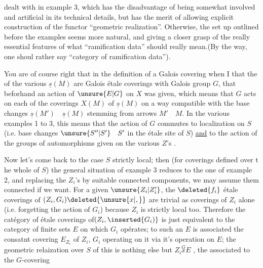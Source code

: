 dealt with in example 3, which has the disadvantage of being somewhat involved and artificial in its technical details, but has the merit of allowing explicit construction of the functor ``geometric realization''. Otherwise, the set up outlined before the examples seems more natural, and giving a closer grasp of the  really essential features of what ``ramification data'' should really mean.(By the way, one shoul rather say ``category of ramification data'').

You are of course right that in the definition of a Galois covering when I  that the  of the various $\underline{s}(M)$ are Galois étale coverings with Galois group $G$, that beforhand an action of $\unsure{E|G}$ on $X$ was given, which means that $G$ acts on each of the coverings $X(M)$ of $\underline{s}(M)$ on a way compatible with the base changes $\underline{s}(M')\quad\underline{s}(M)$ stemming from arrows  $M'\quad M$. In the various examples 1 to 3, this means that the action of $G$ commutes to  localization on $S$ (i.e. base changes $\unsure{S''|S'}\quad S'$ in the étale site of $S$) \uline{and} to the action of the groups of automorphisms given on the various $Z$'s .

Now let's come back to the case $S$ strictly local; then (for coverings defined over t he whole of $S$) the general situation of example 3 reduces to the one of example 2, and replacing the $Z_i$'s by suitable connected components, we may assume them connected if we want. For a given $\unsure{Z_i|Z_i'}$, the $\deleted{f_i}$ étale coverings of $(Z_i,G_i)\deleted{\unsure{x|,}}$ are trivial as coverings of $Z_i$ alone (i.e. forgetting the action of $G_i$) because $Z_i$ is strictly local too. Therefore the catégory of étale coverings of$(Z_i,\inserted{G_i)}$ is just equivalent to the category of finite sets $E$ on which $G_i$ opérates; to such an $E$ is associated the consatnt covering $E_{Z_i}$ of $Z_i$,  $G_i$ operating on it via it's operation on $E$; the geometric relaization over $S$ of this is nothing else but $Z_i\overset{G}{x}E$ , the  associated to the $G$-covering
